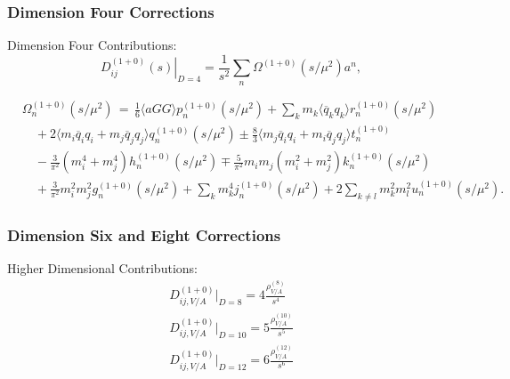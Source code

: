 \documentclass{beamer}
\begin{document}
\begin{frame}
  \frametitle{Dimension Four Corrections}
  Dimension Four Contributions:
  \begin{equation}
    \left. D_{ij}^{(1+0)}(s) \right\rvert_{D=4} = \frac{1}{s^2} \sum_n \Omega^{(1+0)}(s/\mu^2)a^n,
  \end{equation}
  \begin{small}
    \begin{equation}
      \begin{split}
        &\Omega_n^{(1+0)} (s/\mu^2) \,=\, \frac{1}{6}\langle aGG \rangle p_n^{(1+0)}(s/\mu^2) + \sum_k m_k \langle \overline{q}_k q_k \rangle r_n^{(1+0)}(s/\mu^2) \\
        &\quad+ 2\langle m_i \overline{q}_i q_i + m_j \overline{q}_j q_j \rangle q_n^{(1+0)} (s/\mu^2) \pm \frac{8}{3} \langle m_j \overline{q}_i q_i + m_i \overline{q}_j q_j \rangle t_n^{(1+0)} \\
        &\quad- \frac{3}{\pi^2} (m_i^4 + m_j^4) h_n^{(1+0)} (s/\mu^2) \mp \frac{5}{\pi^2} m_i m_j (m_i^2 + m_j^2) k_n^{(1+0)}(s/\mu^2)\\
        &\quad+ \frac{3}{\pi^2} m_i^2 m_j^2 g_n^{(1+0)}(s/\mu^2) + \sum_k m_k^4
        j_n^{(1+0)}(s/\mu^2) + 2 \sum_{k \neq l} m_k^2 m_l^2 u_n^{(1+0)}(s/\mu^2).
      \end{split}
    \end{equation}
  \end{small}
  \begin{tiny}
    \cite{Pich1999}
  \end{tiny}
\end{frame}

\begin{frame}
  \frametitle{Dimension Six  and Eight Corrections}
  Higher Dimensional Contributions:
  \begin{equation}
    \begin{split}
      D_{ij,V/A}^{(1+0)} \biggr\rvert_{D=8} = 4 \frac{\rho_{V/A}^{(8)}}{s^4} \\
      D_{ij,V/A}^{(1+0)} \biggr\rvert_{D=10} = 5 \frac{\rho_{V/A}^{(10)}}{s^5} \\
      D_{ij,V/A}^{(1+0)} \biggr\rvert_{D=12} = 6 \frac{\rho_{V/A}^{(12)}}{s^6}
    \end{split} 
  \end{equation}
\end{frame}
\end{document}

